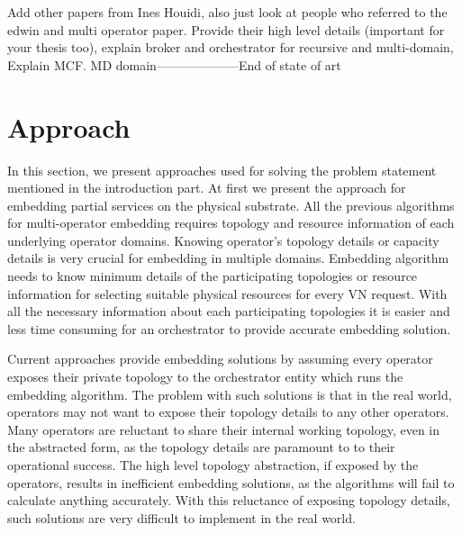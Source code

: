 \documentclass[article,dr=phil,type=msc ,colorback,accentcolor=tud4b]{tudthesis}
\begin{document}
Add other papers from Ines Houidi, also just look at people who referred to the edwin and multi operator paper. Provide their high level details (important for your thesis too), explain broker and orchestrator for recursive and multi-domain, Explain MCF. 
MD domain--------------------End of state of art



\newpage
\section{Approach}
In this section, we present approaches used for solving the problem statement mentioned in the introduction part. At first we present the approach for embedding partial services on the physical substrate. All the previous algorithms for multi-operator embedding requires topology and resource information of each underlying operator domains. Knowing operator's topology details or capacity details is very crucial for embedding in multiple domains. Embedding algorithm needs to know minimum details of the participating topologies or resource information for selecting suitable physical resources for every VN request. With all the necessary information about each participating topologies it is easier and less time consuming for an orchestrator to provide accurate embedding solution. \newline 

Current approaches provide embedding solutions by assuming every operator exposes their private topology to the orchestrator entity which runs the embedding algorithm. The problem with such solutions is that in the real world, operators may not want to expose their topology details to any other operators. Many operators are reluctant to share their internal working topology, even in the abstracted form, as the topology details are paramount to to their operational success. The high level topology abstraction, if exposed by the operators, results in inefficient embedding solutions, as the algorithms will fail to calculate anything accurately. With this reluctance of exposing topology details, such solutions are very difficult to implement in the real world.\newline  
\end{document}
